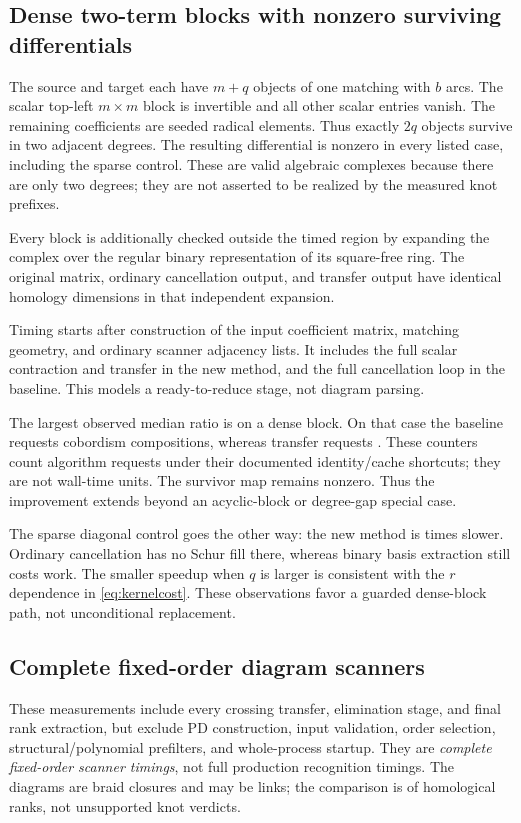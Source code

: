 \documentclass[11pt]{article}
\theoremstyle{definition}\newtheorem{definition}[theorem]{Definition}
\theoremstyle{remark}\newtheorem{remark}[theorem]{Remark}
\begin{document}
\subsection{Dense two-term blocks with nonzero surviving differentials}
The source and target each have $m+q$ objects of one matching with $b$ arcs.
The scalar top-left $m\times m$ block is invertible and all other scalar entries
vanish. The remaining coefficients are seeded radical elements. Thus exactly
$2q$ objects survive in two adjacent degrees. The resulting differential is
nonzero in every listed case, including the sparse control. These are valid
algebraic complexes because there are only two degrees; they are not asserted
to be realized by the measured knot prefixes.

Every block is additionally checked outside the timed region by expanding the
complex over the regular binary representation of its square-free ring. The
original matrix, ordinary cancellation output, and transfer output have identical
homology dimensions in that independent expansion.

Timing starts after construction of the input coefficient matrix, matching
geometry, and ordinary scanner adjacency lists. It includes the full scalar
contraction and transfer in the new method, and the full cancellation loop in
the baseline. This models a ready-to-reduce stage, not diagram parsing.



The largest observed median ratio is \DenseSpeedup{} on a dense block. On that
case the baseline requests \DenseBaseCompositions{} cobordism compositions,
whereas transfer requests \DenseNewCompositions{}. These counters count algorithm
requests under their documented identity/cache shortcuts; they are not wall-time
units. The survivor map remains nonzero. Thus the improvement extends beyond
an acyclic-block or degree-gap special case.

The sparse diagonal control goes the other way: the new method is
\SparseSlowdown{} times slower. Ordinary cancellation has no Schur fill there,
whereas binary basis extraction still costs work. The smaller speedup when $q$
is larger is consistent with the $r$ dependence in \eqref{eq:kernelcost}.
These observations favor a guarded dense-block path, not unconditional replacement.

\subsection{Complete fixed-order diagram scanners}
These measurements include every crossing transfer, elimination stage, and final
rank extraction, but exclude PD construction, input validation, order selection,
structural/polynomial prefilters, and whole-process startup. They are
\emph{complete fixed-order scanner timings}, not full production recognition
timings. The diagrams are braid closures and may be links; the comparison is of
homological ranks, not unsupported knot verdicts.
\end{document}
